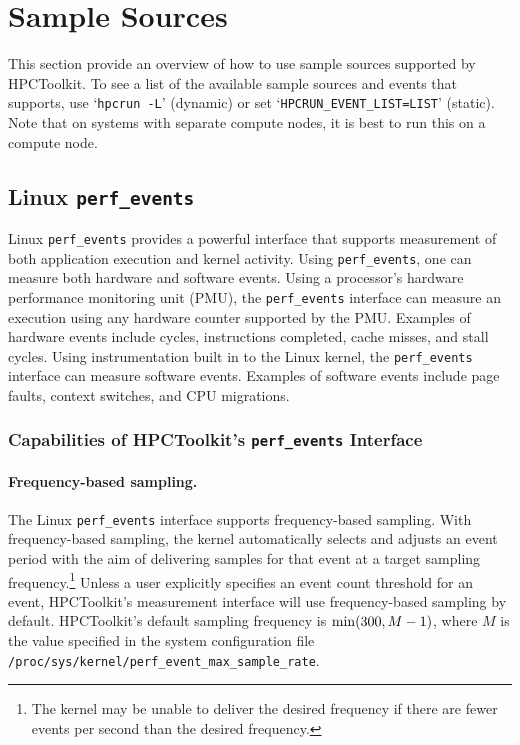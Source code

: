 \section{Sample Sources}
\label{sample-sources}

This section provide an overview of how to use sample sources supported by HPCToolkit.  To
see a list of the available sample sources and events that \hpcrun{}
supports, use `\verb|hpcrun -L|' (dynamic) or set
`\verb|HPCRUN_EVENT_LIST=LIST|' (static).  Note that on systems with
separate compute nodes, it is best to run this on a compute node.

\newcommand{\perfevents}{{\tt perf\_events}}

\subsection{Linux \perfevents}

Linux \perfevents{} provides a powerful interface that supports 
measurement of both application execution and kernel activity. 
Using
\perfevents{}, one can measure both hardware and software events. 
Using a processor's hardware performance monitoring unit (PMU), the
\perfevents{} interface can measure an execution using any hardware counter
supported by the PMU. Examples of hardware events include cycles, instructions
completed, cache misses, and stall cycles. Using instrumentation built in to the Linux kernel,
the \perfevents{} interface can measure software events. Examples of software events include page
faults, context switches, and CPU migrations. 



\subsubsection{Capabilities of HPCToolkit's \perfevents{} Interface}

\paragraph{Frequency-based sampling.} 
The Linux \perfevents{} interface supports frequency-based sampling. 
With frequency-based sampling, the kernel automatically selects and adjusts an event period with the
aim of delivering samples for that event at a target sampling frequency.\footnote{The 
kernel may be unable to deliver the desired frequency if 
there are fewer events per second than the desired frequency.}  
Unless a user explicitly specifies an event count threshold for an event, 
HPCToolkit's measurement interface will use frequency-based sampling by default.  
HPCToolkit's default sampling frequency is ${\rm min}(300,M-1)$, where $M$ is the 
value specified in the system configuration file \verb|/proc/sys/kernel/perf_event_max_sample_rate|.

